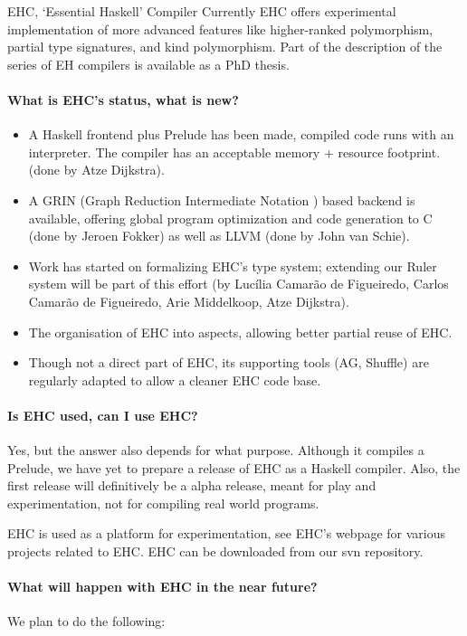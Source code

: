 \documentclass{article}
\begin{document}
\begin{hcarentry}{EHC, `Essential Haskell' Compiler}
Currently EHC offers experimental implementation of more advanced features like
higher-ranked polymorphism, partial type signatures, and kind polymorphism.
Part of the description of the series of EH compilers is available
as a PhD thesis.

\paragraph{What is EHC's status, what is new?}
\begin{itemize}
\item
   A Haskell frontend plus Prelude has been made, compiled code runs with an interpreter.
   The compiler has an acceptable memory + resource footprint.
   (done by Atze Dijkstra).
\item
   A GRIN (Graph Reduction Intermediate Notation \cite{boquist99phd-optim-lazy}) based backend is available,
   offering global program optimization and code generation to C (done by Jeroen Fokker) as well as LLVM (done by John van Schie).
\item
   Work has started on formalizing EHC's type system; extending our Ruler system will be part of this effort
   (by Luc\'ilia Camar\~ao de Figueiredo, Carlos Camar\~ao de Figueiredo, Arie Middelkoop, Atze Dijkstra).
\item
   The organisation of EHC into aspects, allowing better partial reuse of EHC.
\item
   Though not a direct part of EHC, its supporting tools (AG, Shuffle) are regularly adapted to allow a cleaner EHC code base.
\end{itemize}

\paragraph{Is EHC used, can I use EHC?}
Yes, but the answer also depends for what purpose.
Although it compiles a Prelude, we have yet to prepare a release of EHC as a Haskell compiler.
Also, the first release will definitively be a alpha release, meant for play and experimentation,
not for compiling real world programs.

EHC is used as a platform for experimentation, see EHC's webpage for various projects related to EHC.
EHC can be downloaded from our svn repository.

\paragraph{What will happen with EHC in the near future?}
We plan to do the following:


\end{hcarentry}
\end{document}
